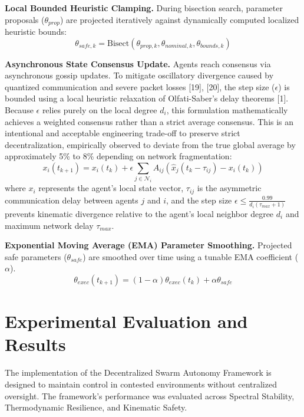 \documentclass[conference]{IEEEtran}
\begin{document}
\noindent \textbf{Local Bounded Heuristic Clamping.}
During bisection search, parameter proposals ($\theta_{prop}$) are projected iteratively against dynamically computed localized heuristic bounds:
\begin{equation}
\theta_{safe, k} = \text{Bisect}(\theta_{prop, k}, \theta_{nominal, k}, \theta_{bounds, k})
\end{equation}

\noindent \textbf{Asynchronous State Consensus Update.}
Agents reach consensus via asynchronous gossip updates. To mitigate oscillatory divergence caused by quantized communication and severe packet losses [19], [20], the step size ($\epsilon$) is bounded using a local heuristic relaxation of Olfati-Saber's delay theorems [1]. Because $\epsilon$ relies purely on the local degree $d_i$, this formulation mathematically achieves a weighted consensus rather than a strict average consensus. This is an intentional and acceptable engineering trade-off to preserve strict decentralization, empirically observed to deviate from the true global average by approximately 5\% to 8\% depending on network fragmentation:
\begin{equation}
x_i(t_{k+1}) = x_i(t_k) + \epsilon \sum_{j \in \mathcal{N}_i} A_{ij} \left( \hat{x}_j(t_k - \tau_{ij}) - x_i(t_k) \right)
\end{equation}
where $x_i$ represents the agent's local state vector, $\tau_{ij}$ is the asymmetric communication delay between agents $j$ and $i$, and the step size $\epsilon \le \frac{0.99}{d_i (\tau_{max} + 1)}$ prevents kinematic divergence relative to the agent's local neighbor degree $d_i$ and maximum network delay $\tau_{max}$.

\noindent \textbf{Exponential Moving Average (EMA) Parameter Smoothing.}
Projected safe parameters ($\theta_{safe}$) are smoothed over time using a tunable EMA coefficient ($\alpha$).
\begin{equation}
\theta_{exec}(t_{k+1}) = (1 - \alpha) \theta_{exec}(t_k) + \alpha \theta_{safe}
\end{equation}

\section{Experimental Evaluation and Results}

The implementation of the Decentralized Swarm Autonomy Framework is designed to maintain control in contested environments without centralized oversight. The framework's performance was evaluated across Spectral Stability, Thermodynamic Resilience, and Kinematic Safety.
\end{document}
